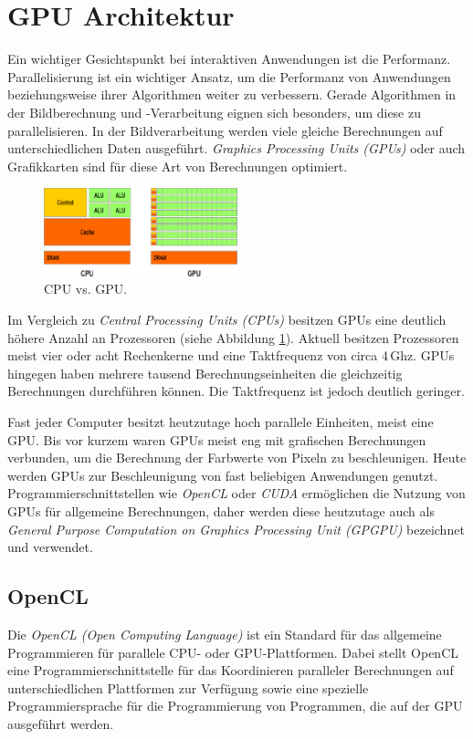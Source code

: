 \section{GPU Architektur}\label{sec::gpuarc}
Ein wichtiger Gesichtspunkt bei interaktiven Anwendungen ist die Performanz.
Parallelisierung ist ein wichtiger Ansatz, um die Performanz von Anwendungen beziehungsweise ihrer Algorithmen weiter zu verbessern.
Gerade Algorithmen in der Bildberechnung und -Verarbeitung eignen sich besonders, um diese zu parallelisieren.
In der Bildverarbeitung werden viele gleiche Berechnungen auf unterschiedlichen Daten ausgeführt.
\emph{Graphics Processing Units (GPUs)} oder auch Grafikkarten sind für diese Art von Berechnungen optimiert.
\begin{figure}
	\centering
	\includegraphics[width=0.5\textwidth]{../../Grafiken/CPU-GPU-Structures1.png}
	\caption{CPU vs. GPU. \cite{kcg}}
	\label{fig::ga01}
\end{figure}
Im Vergleich zu \emph{Central Processing Units (CPUs)} besitzen GPUs eine deutlich höhere Anzahl an Prozessoren (siehe Abbildung \ref{fig::ga01}).
Aktuell besitzen Prozessoren meist vier oder acht Rechenkerne und eine Taktfrequenz von circa 4\,Ghz.
GPUs hingegen haben mehrere tausend Berechnungseinheiten die gleichzeitig Berechnungen durchführen können.
Die Taktfrequenz ist jedoch deutlich geringer.

Fast jeder Computer besitzt heutzutage hoch parallele Einheiten, meist eine GPU.
Bis vor kurzem waren GPUs meist eng mit grafischen Berechnungen verbunden, um die Berechnung der Farbwerte von Pixeln zu beschleunigen.
Heute werden GPUs zur Beschleunigung von fast beliebigen Anwendungen genutzt.
Programmierschnittstellen wie \emph{OpenCL} oder \emph{CUDA} ermöglichen die Nutzung von GPUs für allgemeine Berechnungen, daher werden diese heutzutage auch als \emph{General Purpose Computation on Graphics Processing Unit (GPGPU)} bezeichnet und verwendet.

\subsection*{OpenCL}
Die \emph{OpenCL (Open Computing Language)} ist ein Standard für das allgemeine Programmieren für parallele CPU- oder GPU-Plattformen.
Dabei stellt OpenCL eine Programmierschnittstelle für das Koordinieren paralleler Berechnungen auf unterschiedlichen Plattformen zur Verfügung sowie eine spezielle Programmiersprache für die Programmierung von Programmen, die auf der GPU ausgeführt werden.

